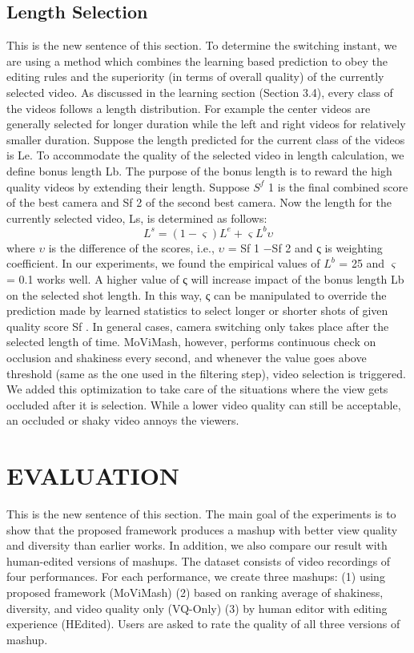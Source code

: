 \documentclass{sig-alternate}
\begin{document}
{{{\subsection{Length Selection}
This is the new sentence of this section.
To determine the switching instant, we are using a method which
combines the learning based prediction to obey the editing rules and
the superiority (in terms of overall quality) of the currently selected
video. As discussed in the learning section (Section 3.4), every
class of the videos follows a length distribution. For example the
center videos are generally selected for longer duration while the
left and right videos for relatively smaller duration.
Suppose the length predicted for the current class of the videos
is Le. To accommodate the quality of the selected video in length
calculation, we define bonus length Lb. The purpose of the bonus
length is to reward the high quality videos by extending their length.
Suppose $S^f$
1 is the final combined score of the best camera and Sf
2
of the second best camera. Now the length for the currently selected
video, Ls, is determined as follows:
$$
  L^s=(1-\varsigma)L^e + \varsigma{L^b}\upsilon
$$
where $\upsilon$ is the difference of the scores, i.e., $\upsilon$ = Sf
1
−Sf
2 and ς is
weighting coefficient. In our experiments, we found the empirical
values of $L^b$ = 25 and $\varsigma$ = 0.1 works well. A higher value of
ς will increase impact of the bonus length Lb on the selected shot
length. In this way, ς can be manipulated to override the prediction
made by learned statistics to select longer or shorter shots of given
quality score Sf .
In general cases, camera switching only takes place after the selected
length of time. MoViMash, however, performs continuous
check on occlusion and shakiness every second, and whenever the
value goes above threshold (same as the one used in the filtering
step), video selection is triggered. We added this optimization to
take care of the situations where the view gets occluded after it is
selection. While a lower video quality can still be acceptable, an
occluded or shaky video annoys the viewers.

\section{EVALUATION}
This is the new sentence of this section.
The main goal of the experiments is to show that the proposed
framework produces a mashup with better view quality and diversity
than earlier works. In addition, we also compare our result with
human-edited versions of mashups. The dataset consists of video
recordings of four performances. For each performance, we create
three mashups: (1) using proposed framework (MoViMash) (2)
based on ranking average of shakiness, diversity, and video quality 
only (VQ-Only) (3) by human editor with editing experience (HEdited).
Users are asked to rate the quality of all three versions of
mashup.
}}}
\end{document}

